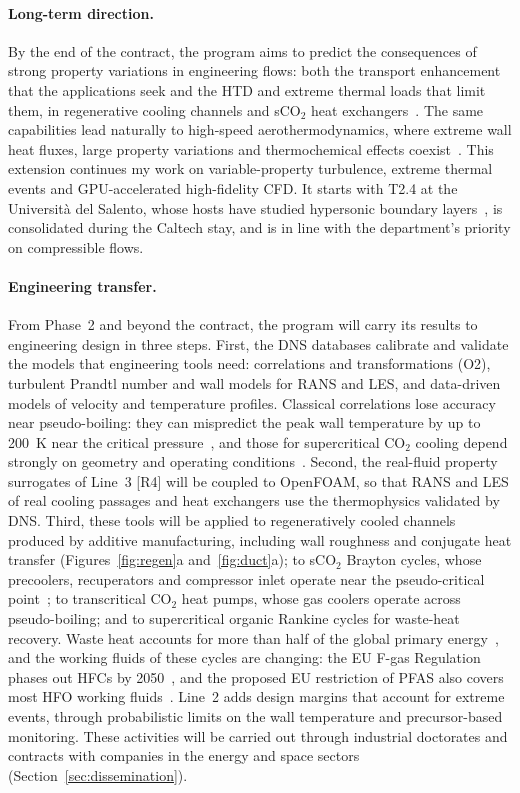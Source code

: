 \documentclass[11pt]{article}
\begin{document}
\paragraph{Long-term direction.} By the end of the contract, the program aims to predict the
consequences of strong property variations in engineering flows: both the transport
enhancement that the applications seek and the HTD and extreme thermal loads that limit them, in
regenerative cooling channels and sCO$_2$ heat exchangers~\cite{Pizzarelli2018,Ahn2015}. The
same capabilities lead naturally to high-speed aerothermodynamics, where extreme wall heat
fluxes, large property variations and thermochemical effects
coexist~\cite{Urzay2018,DiRenzoUrzay2021,Passiatore2022}. This extension continues my work on
variable-property turbulence, extreme thermal events and GPU-accelerated high-fidelity CFD. It
starts with T2.4 at the Universit\`a del Salento, whose hosts have studied hypersonic
boundary layers~\cite{DiRenzoUrzay2021,Passiatore2022}, is consolidated during the Caltech stay, and
is in line with the department's priority on compressible flows.

\paragraph{Engineering transfer.} From Phase~2 and beyond the contract, the program will carry its
results to engineering design in three steps. First, the DNS databases calibrate and validate the
models that engineering tools need: correlations and transformations (O2), turbulent Prandtl number
and wall models for RANS and LES, and data-driven models of velocity and temperature profiles.
Classical correlations lose accuracy near pseudo-boiling: they can mispredict the peak wall
temperature by up to 200~K near the critical pressure~\cite{Nasuti2021}, and those for
supercritical CO$_2$ cooling depend strongly on geometry and operating
conditions~\cite{Pitla1998}. Second, the real-fluid property surrogates of Line~3 [R4] will be
coupled to OpenFOAM, so that RANS and LES of real cooling passages and heat exchangers use the
thermophysics validated by DNS. Third, these tools will be applied to regeneratively cooled channels
produced by additive manufacturing, including wall roughness and conjugate heat transfer
(Figures~\ref{fig:regen}a and~\ref{fig:duct}a); to sCO$_2$ Brayton cycles, whose precoolers,
recuperators and compressor inlet operate near the pseudo-critical point~\cite{Ahn2015}; to
transcritical CO$_2$ heat pumps, whose gas coolers operate across pseudo-boiling; and to
supercritical organic Rankine cycles for waste-heat recovery. Waste heat accounts for more than half
of the global primary energy~\cite{Markides2025}, and the working fluids of these cycles are changing:
the EU F-gas Regulation phases out HFCs by 2050~\cite{FGas2024}, and the proposed EU restriction of
PFAS also covers most HFO working fluids~\cite{ECHA2025}. Line~2 adds design margins that account for
extreme events, through probabilistic limits on the wall temperature and precursor-based monitoring.
These activities will be carried out through industrial doctorates and contracts with companies in
the energy and space sectors (Section~\ref{sec:dissemination}).
\end{document}

